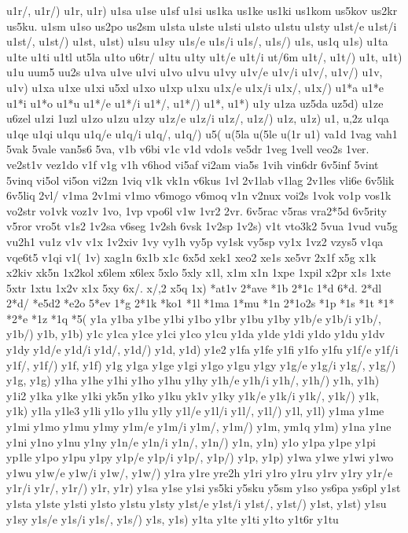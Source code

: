 {{u1r/,
u1r/)
u1r,
u1r)
u1sa
u1se
u1sf
u1si
us1ka
us1ke
us1ki
us1kom
us5kov
us2kr
us5ku.
u1sm
u1so
us2po
us2sm
u1sta
u1ste
u1sti
u1sto
u1stu
u1sty
u1st/e
u1st/i
u1st/,
u1st/)
u1st,
u1st)
u1su
u1sy
u1s/e
u1s/i
u1s/,
u1s/)
u1s,
us1q
u1s)
u1ta
u1te
u1ti
u1tl
ut5la
u1to
u6tr/
u1tu
u1ty
u1t/e
u1t/i
ut/6m
u1t/,
u1t/)
u1t,
u1t)
u1u
uum5
uu2s
u1va
u1ve
u1vi
u1vo
u1vu
u1vy
u1v/e
u1v/i
u1v/,
u1v/)
u1v,
u1v)
u1xa
u1xe
u1xi
u5xl
u1xo
u1xp
u1xu
u1x/e
u1x/i
u1x/,
u1x/)
u1*a
u1*e
u1*i
u1*o
u1*u
u1*/e
u1*/i
u1*/,
u1*/)
u1*,
u1*)
u1y
u1za
uz5da
uz5d)
u1ze
u6zel
u1zi
1uzl
u1zo
u1zu
u1zy
u1z/e
u1z/i
u1z/,
u1z/)
u1z,
u1z)
u1,
u,2z
u1qa
u1qe
u1qi
u1qu
u1q/e
u1q/i
u1q/,
u1q/)
u5(
u(5la
u(5le
u(1r
u1)
va1d
1vag
vah1
5vak
5vale
van5s6
5va,
v1b
v6bi
v1c
v1d
vdo1s
ve5dr
1veg
1vell
veo2s
1ver.
ve2st1v
vez1do
v1f
v1g
v1h
v6hod
vi5af
vi2am
via5s
1vih
vin6dr
6v5inf
5vint
5vinq
vi5ol
vi5on
vi2zn
1viq
v1k
vk1n
v6kus
1vl
2v1lab
v1lag
2v1les
vli6e
6v5lik
6v5liq
2vl/
v1ma
2v1mi
v1mo
v6mogo
v6moq
v1n
v2nux
voi2s
1vok
vo1p
vos1k
vo2str
vo1vk
voz1v
1vo,
1vp
vpo6l
v1w
1vr2
2vr.
6v5rac
v5ras
vra2*5d
6v5rity
v5ror
vro5t
v1s2
1v2sa
v6seg
1v2sh
6vsk
1v2sp
1v2s)
v1t
vto3k2
5vua
1vud
vu5g
vu2h1
vu1z
v1v
v1x
1v2xiv
1vy
vy1h
vy5p
vy1sk
vy5sp
vy1x
1vz2
vzys5
v1qa
vqe6t5
v1qi
v1(
1v)
xag1n
6x1b
x1c
6x5d
xek1
xeo2
xe1s
xe5vr
2x1f
x5g
x1k
x2kiv
xk5n
1x2kol
x6lem
x6lex
5xlo
5xly
x1l,
x1m
x1n
1xpe
1xpil
x2pr
x1s
1xte
5xtr
1xtu
1x2v
x1x
5xy
6x/.
x/,2
x5q
1x)
*at1v
2*ave
*1b
2*1c
1*d
6*d.
2*dl
2*d/
*e5d2
*e2o
5*ev
1*g
2*1k
*ko1
*1l
*1ma
1*mu
*1n
2*1o2s
*1p
*1s
*1t
*1*
*2*e
*1z
*1q
*5(
y1a
y1ba
y1be
y1bi
y1bo
y1br
y1bu
y1by
y1b/e
y1b/i
y1b/,
y1b/)
y1b,
y1b)
y1c
y1ca
y1ce
y1ci
y1co
y1cu
y1da
y1de
y1di
y1do
y1du
y1dv
y1dy
y1d/e
y1d/i
y1d/,
y1d/)
y1d,
y1d)
y1e2
y1fa
y1fe
y1fi
y1fo
y1fu
y1f/e
y1f/i
y1f/,
y1f/)
y1f,
y1f)
y1g
y1ga
y1ge
y1gi
y1go
y1gu
y1gy
y1g/e
y1g/i
y1g/,
y1g/)
y1g,
y1g)
y1ha
y1he
y1hi
y1ho
y1hu
y1hy
y1h/e
y1h/i
y1h/,
y1h/)
y1h,
y1h)
y1i2
y1ka
y1ke
y1ki
yk5n
y1ko
y1ku
yk1v
y1ky
y1k/e
y1k/i
y1k/,
y1k/)
y1k,
y1k)
y1la
y1le3
y1li
y1lo
y1lu
y1ly
y1l/e
y1l/i
y1l/,
y1l/)
y1l,
y1l)
y1ma
y1me
y1mi
y1mo
y1mu
y1my
y1m/e
y1m/i
y1m/,
y1m/)
y1m,
ym1q
y1m)
y1na
y1ne
y1ni
y1no
y1nu
y1ny
y1n/e
y1n/i
y1n/,
y1n/)
y1n,
y1n)
y1o
y1pa
y1pe
y1pi
yp1le
y1po
y1pu
y1py
y1p/e
y1p/i
y1p/,
y1p/)
y1p,
y1p)
y1wa
y1we
y1wi
y1wo
y1wu
y1w/e
y1w/i
y1w/,
y1w/)
y1ra
y1re
yre2h
y1ri
y1ro
y1ru
y1rv
y1ry
y1r/e
y1r/i
y1r/,
y1r/)
y1r,
y1r)
y1sa
y1se
y1si
ys5ki
y5sku
y5sm
y1so
ys6pa
ys6pl
y1st
y1sta
y1ste
y1sti
y1sto
y1stu
y1sty
y1st/e
y1st/i
y1st/,
y1st/)
y1st,
y1st)
y1su
y1sy
y1s/e
y1s/i
y1s/,
y1s/)
y1s,
y1s)
y1ta
y1te
y1ti
y1to
y1t6r
y1tu
}}
